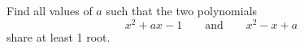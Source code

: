 Find all values of $a$ such that the two polynomials \[x^2+ax-1\qquad\text{and}\qquad x^2-x+a\] share at least 1 root.